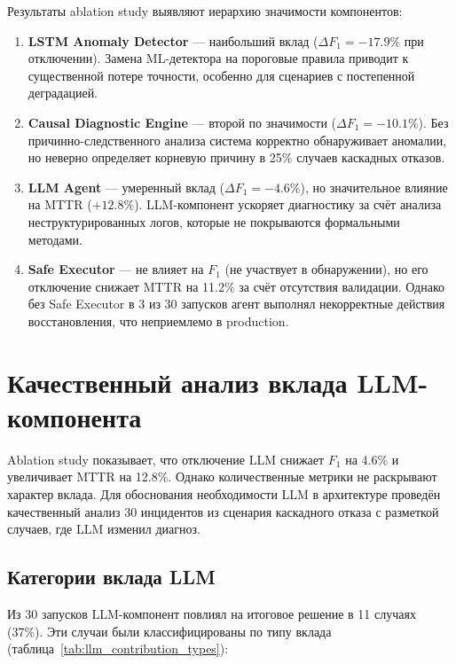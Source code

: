 Результаты ablation study выявляют иерархию значимости компонентов:

\begin{enumerate}
    \item \textbf{LSTM Anomaly Detector} --- наибольший вклад ($\Delta F_1 = -17.9\%$ при отключении). Замена ML-детектора на пороговые правила приводит к существенной потере точности, особенно для сценариев с постепенной деградацией.

    \item \textbf{Causal Diagnostic Engine} --- второй по значимости ($\Delta F_1 = -10.1\%$). Без причинно-следственного анализа система корректно обнаруживает аномалии, но неверно определяет корневую причину в 25\% случаев каскадных отказов.

    \item \textbf{LLM Agent} --- умеренный вклад ($\Delta F_1 = -4.6\%$), но значительное влияние на MTTR ($+12.8\%$). LLM-компонент ускоряет диагностику за счёт анализа неструктурированных логов, которые не покрываются формальными методами.

    \item \textbf{Safe Executor} --- не влияет на $F_1$ (не участвует в обнаружении), но его отключение снижает MTTR на 11.2\% за счёт отсутствия валидации. Однако без Safe Executor в 3 из 30 запусков агент выполнял некорректные действия восстановления, что неприемлемо в production.
\end{enumerate}

\section{Качественный анализ вклада LLM-компонента}

Ablation study показывает, что отключение LLM снижает $F_1$ на 4.6\% и увеличивает MTTR на 12.8\%. Однако количественные метрики не раскрывают характер вклада. Для обоснования необходимости LLM в архитектуре проведён качественный анализ 30 инцидентов из сценария каскадного отказа с разметкой случаев, где LLM изменил диагноз.

\subsection{Категории вклада LLM}

Из 30 запусков LLM-компонент повлиял на итоговое решение в 11 случаях (37\%). Эти случаи были классифицированы по типу вклада (таблица~\ref{tab:llm_contribution_types}):

